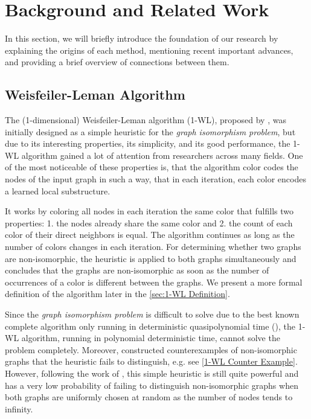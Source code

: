 \section{Background and Related Work}\label{sec:related_work}
In this section, we will briefly introduce the foundation of our research by explaining the origins of each method, mentioning recent important advances, and providing a brief overview of connections between them.


 

\subsection{Weisfeiler-Leman Algorithm}
The (1-dimensional) Weisfeiler-Leman algorithm (1-WL), proposed by \cite{Wei+1968}, was initially designed as a simple heuristic for the \textit{graph isomorphism problem}, but due to its interesting properties, its simplicity, and its good performance, the 1-WL algorithm gained a lot of attention from researchers across many fields. One of the most noticeable of these properties is, that the algorithm color codes the nodes of the input graph in such a way, that in each iteration, each color encodes a learned local substructure.

It works by coloring all nodes in each iteration the same color that fulfills two properties: 1. the nodes already share the same color and 2. the count of each color of their direct neighbors is equal. The algorithm continues as long as the number of colors changes in each iteration.
For determining whether two graphs are non-isomorphic, the heuristic is applied to both graphs simultaneously and concludes that the graphs are non-isomorphic as soon as the number of occurrences of a color is different between the graphs. We present a more formal definition of the algorithm later in the \autoref{sec:1-WL Definition}.

Since the \textit{graph isomorphism problem} is difficult to solve due to the best known complete algorithm only running in deterministic quasipolynomial time (\cite{Babai2016}), the 1-WL algorithm, running in polynomial deterministic time, cannot solve the problem completely. Moreover, \cite{Cai1992} constructed counterexamples of non-isomorphic graphs that the heuristic fails to distinguish, e.g. see \autoref{1-WL Counter Example}. However, following the work of \cite{Bab+1979}, this simple heuristic is still quite powerful and has a very low probability of failing to distinguish non-isomorphic graphs when both graphs are uniformly chosen at random as the number of nodes tends to infinity.

